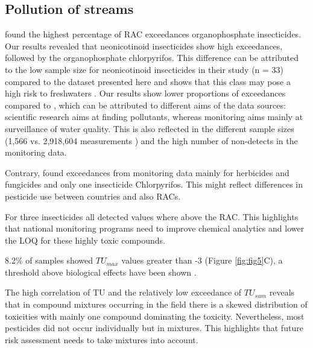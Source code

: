 \documentclass[journal=esthag,manuscript=article]{achemso}
\begin{document}
\subsection{Pollution of streams}


\citet{stehle_pesticide_2015} found the highest percentage of RAC exceedances organophosphate insecticides. 
Our results revealed that neonicotinoid insecticides show high exceedances, followed by the organophosphate chlorpyrifos. 
This difference can be attributed to the low sample size for neonicotinoid insecticides in their study (n = 33) compared to the dataset presented here  and shows that this class may pose a high risk to freshwaters .
Our results show lower proportions of exceedances compared to \citet{stehle_pesticide_2015}, which can be attributed to different aims of the data sources: scientific research aims at finding pollutants, whereas monitoring aims mainly at surveillance of water quality. 
This is also reflected in the different sample sizes (1,566 vs. 2,918,604 measurements ) and the high number of non-detects in the monitoring data.

Contrary, \citet{knauer_pesticides_2016} found exceedances from monitoring data mainly for herbicides and fungicides and only one insecticide Chlorpyrifos.
This might reflect differences in pesticide use between countries and also RACs.

For three insecticides all detected values where above the RAC.
This highlights that national monitoring programs need to improve chemical analytics and lower the LOQ for these highly toxic compounds.


8.2\% of samples showed $TU_{max}$ values greater than -3 (Figure \ref{fig:fig5}C), a threshold above biological effects have been shown \citep{schafer_thresholds_2012}.

The high correlation of TU and the relatively low exceedance of $TU_{sum}$ reveals that in compound mixtures occurring in the field there is a skewed distribution of toxicities with mainly one compound dominating the toxicity.
Nevertheless, most pesticides did not occur individually but in mixtures.
This highlights that future risk assessment needs to take mixtures into account.







\end{document}
